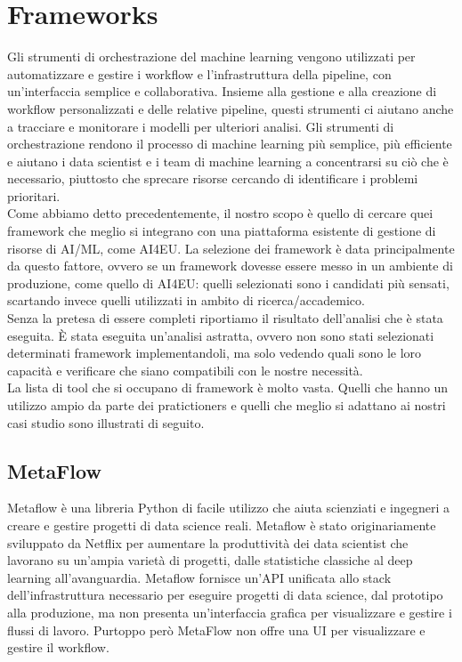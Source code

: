 \documentclass[12pt,a4paper]{report}
\begin{document}
\chapter{Frameworks}
Gli strumenti di orchestrazione del machine learning vengono utilizzati per automatizzare e gestire i workflow e l'infrastruttura della pipeline, con un'interfaccia semplice e collaborativa. Insieme alla gestione e alla creazione di workflow personalizzati e delle relative pipeline, questi strumenti ci aiutano anche a tracciare e monitorare i modelli per ulteriori analisi.
Gli strumenti di orchestrazione rendono il processo di machine learning più semplice, più efficiente e aiutano i data scientist e i team di machine learning a concentrarsi su ciò che è necessario, piuttosto che sprecare risorse cercando di identificare i problemi prioritari.\\
Come abbiamo detto precedentemente, il nostro scopo è quello di cercare quei framework che meglio si integrano con una piattaforma esistente di gestione di risorse di AI/ML, come AI4EU. La selezione dei framework è data principalmente da questo fattore, ovvero se un framework dovesse essere messo in un ambiente di produzione, come quello di AI4EU: quelli selezionati sono i candidati più sensati, scartando invece quelli utilizzati in ambito di ricerca/accademico.\\
Senza la pretesa di essere completi riportiamo il risultato dell'analisi che è stata eseguita.
È stata eseguita un'analisi astratta, ovvero non sono stati selezionati determinati framework implementandoli, ma solo vedendo quali sono le loro capacità e verificare che siano compatibili con le nostre necessità.\\
La lista di tool che si occupano di framework è molto vasta. Quelli che hanno un utilizzo ampio da parte dei pratictioners e quelli che meglio si adattano ai nostri casi studio sono illustrati di seguito.

\section{MetaFlow}
Metaflow è una libreria Python di facile utilizzo che aiuta scienziati e ingegneri a creare e gestire progetti di data science reali. Metaflow è stato originariamente sviluppato da Netflix per aumentare la produttività dei data scientist che lavorano su un'ampia varietà di progetti, dalle statistiche classiche al deep learning all'avanguardia. \cite{MetaFLow}
Metaflow fornisce un'API unificata allo stack dell'infrastruttura necessario per eseguire progetti di data science, dal prototipo alla produzione, ma non presenta un'interfaccia grafica per visualizzare e gestire i flussi di lavoro.
Purtoppo però MetaFlow non offre una UI per visualizzare e gestire il workflow.\\
\end{document}
